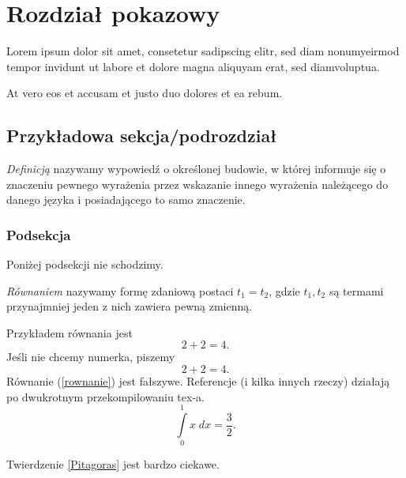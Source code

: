 \documentclass[pl]{minipw} %
\begin{document}
\chapter{Rozdział pokazowy}

Lorem ipsum dolor sit amet, consetetur sadipscing elitr, sed diam nonumyeirmod tempor invidunt ut labore et dolore magna aliquyam erat, sed diamvoluptua.

At vero eos et accusam et justo duo dolores et ea rebum.


\section{Przykładowa sekcja/podrozdział}

\begin{definition}[Definicja]
\textit{Definicją} nazywamy wypowiedź o określonej budowie, w której informuje się o znaczeniu pewnego wyrażenia przez wskazanie innego wyrażenia należącego do danego języka i posiadającego to samo znaczenie.
\end{definition}

\subsection{Podsekcja}

Poniżej podsekcji nie schodzimy.

\begin{definition}
\textit{Równaniem} nazywamy formę zdaniową postaci $t_1 = t_2$, gdzie $t_1, t_2$ są termami przynajmniej jeden z nich zawiera pewną zmienną.
\end{definition}

\begin{example}
Przykładem równania jest
\begin{equation}
2+2=4.
\end{equation}
Jeśli nie chcemy numerka, piszemy
\begin{equation*}
2+2=4.
\end{equation*}
Równanie (\ref{rownanie}) jest fałszywe. Referencje (i kilka innych rzeczy) działają po dwukrotnym przekompilowaniu tex-a.
\begin{equation}\label{rownanie}
\int \limits_{0}^{1} x \; dx = \frac{3}{2}.
\end{equation}

\end{example}

Twierdzenie \ref{Pitagoras} jest bardzo ciekawe.
\end{document}
